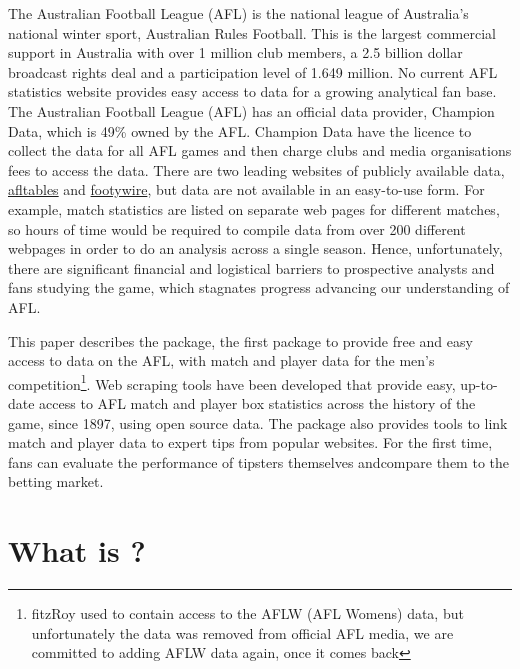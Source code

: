 The Australian Football League (AFL) is the national league of Australia's national winter sport, Australian Rules Football. This is the largest commercial support in Australia with over 1 million club members, a 2.5 billion dollar broadcast rights deal and a participation level of 1.649 million. No current AFL statistics website provides easy access to data for a growing analytical fan base. The Australian Football League (AFL) has an official data provider, Champion Data, which is 49\% owned by the AFL. Champion Data have the licence to collect the data for all AFL games and then charge clubs and media organisations fees to access the data. There are two leading websites of publicly available data, \href{https://afltables.com/afl/aflindex.html}{afltables} and \href{https://www.footywire.com}{footywire}, but data are not available in an easy-to-use form. For example, match statistics are listed on separate web pages for different matches, so hours of time would be required to compile data from over 200 different webpages in order to do an analysis across a single season. Hence, unfortunately, there are significant financial and logistical barriers to prospective analysts and fans studying the game, which stagnates progress advancing our understanding of AFL.



This paper describes the   package, the first package to provide free and easy access to data on the AFL, with match and player data for the men's competition\footnote{fitzRoy used to contain access to the AFLW (AFL Womens) data, but unfortunately the data was removed from official AFL media, we are committed to adding AFLW data again, once it comes back}. Web scraping tools have been developed that provide easy, up-to-date access to AFL match and player box statistics across the history of the game, since 1897, using open source data. The package also provides tools to link match and player data to expert tips from popular websites.  For the first time, fans can evaluate the performance of tipsters themselves andcompare them to the betting market.


\section{What is ?}

